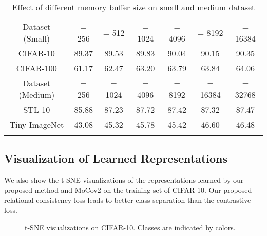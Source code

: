 \documentclass{article}
\newcommand{\<}{\left\langle}
\renewcommand{\>}{\right\rangle}
\begin{document}
\renewcommand\arraystretch{1.15}
\begin{table}[h]
\vspace{-5pt}
 \centering
 \setlength\tabcolsep{5pt}
 \small
 \caption{Effect of different memory buffer size on small and medium dataset}
 \vspace{-5pt}
 \label{table:ablation_buffer}
\begin{tabular}{c c c c c c c } 
\toprule 
Dataset (Small)     &  = 256 &  = 512 &  = 1024 &  = 4096 &  = 8192 &  = 16384  \\
CIFAR-10    & 89.37   & 89.53   & 89.83    & 90.04    & 90.15    & 90.35 \\ 
CIFAR-100   & 61.17   & 62.47   & 63.20    & 63.79    & 63.84    & 64.06 \\ \hline
Dataset (Medium)    &  = 256 &  = 1024 &  = 4096 &  = 8192 &  = 16384 &  = 32768 \\
STL-10          & 85.88   & 87.23    & 87.72 &  87.42   & 87.32     & 87.47 \\
Tiny ImageNet   & 43.08   & 45.32    & 45.78 &  45.42   & 46.60     & 46.48\\
\toprule 
\vspace{-25pt}
\end{tabular}
\end{table}



\subsection{Visualization of Learned Representations}
We also show the t-SNE \cite{tsne} visualizations of the representations learned by our proposed method and MoCov2 on the training set of CIFAR-10. Our proposed relational consistency loss leads to better class separation than the contrastive loss.

\begin{figure*}[h]
    \vspace{-10pt}
    \centering
    \caption{t-SNE visualizations on CIFAR-10. Classes are indicated by colors.}
    \vspace{-10pt}
    \label{fig:tsne}
\end{figure*}
\end{document}
